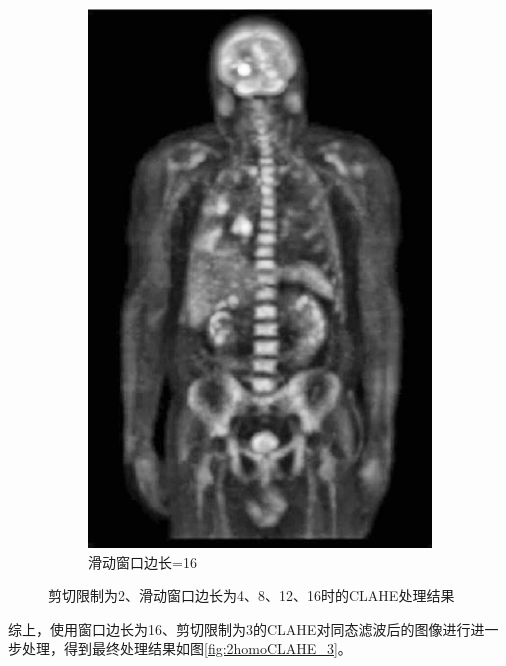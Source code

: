 \documentclass[a4paper]{ctexart}
\newcommand{\outwfour}{0.23\textwidth}
\newcommand{\outwthree}{0.3\textwidth}
\begin{document}
\begin{spacing}{1.35}
\begin{figure}[htbp]
\begin{subfigure}[t]{\outwfour}
			\includegraphics[width=\textwidth]{figure/2_tile_grid_size_16.png}
			\caption{滑动窗口边长=16}
		\end{subfigure}
		\caption{剪切限制为2、滑动窗口边长为4、8、12、16时的CLAHE处理结果}
		\label{fig:2homoCLAHE_2}
	\end{figure}
	综上，使用窗口边长为16、剪切限制为3的CLAHE对同态滤波后的图像进行进一步处理，得到最终处理结果如图\ref{fig:2homoCLAHE_3}。
	\begin{figure}[htbp]
		\centering
		\begin{subfigure}[t]{\outwthree}
			\centering

\end{subfigure}
\end{figure}
\end{spacing}
\end{document}
